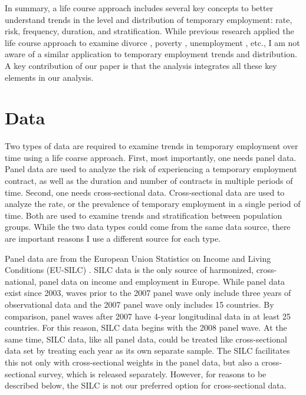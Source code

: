 \documentclass[12pt]{article}
\begin{document}
In summary, a life course approach includes several key concepts to better understand trends in the level and distribution of temporary employment: rate, risk, frequency, duration, and stratification.  While previous research applied the life course approach to examine divorce \citep{kennedy_ruggles_2014}, poverty \citep{sandoval_etal_2009}, unemployment \citep{dietrich_2013}, etc., I am not aware of a similar application to temporary employment trends and distribution.  A key contribution of our paper is that the analysis integrates all these key elements in our analysis.

\section{Data}

Two types of data are required to examine trends in temporary employment over time using a life coarse approach.  First, most importantly, one needs panel data.  Panel data are used to analyze the risk of experiencing a temporary employment contract, as well as the duration and number of contracts in multiple periods of time.  Second, one needs cross-sectional data.  Cross-sectional data are used to analyze the rate, or the prevalence of temporary employment in a single period of time.  Both are used to examine trends and stratification between population groups.  While the two data types could come from the same data source, there are important reasons I use a different source for each type.

Panel data are from the European Union Statistics on Income and Living Conditions (EU-SILC) \citep{eu_silc}.  SILC data is the only source of harmonized, cross-national, panel data on income and employment in Europe.  While panel data exist since 2003, waves prior to the 2007 panel wave only include three years of observational data and the 2007 panel wave only includes 15 countries.  By comparison, panel waves after 2007 have 4-year longitudinal data in at least 25 countries.  For this reason, SILC data begins with the 2008 panel wave.  At the same time, SILC data, like all panel data, could be treated like cross-sectional data set by treating each year as its own separate sample.  The SILC facilitates this not only with cross-sectional weights in the panel data, but also a cross-sectional survey, which is released separately.  However, for reasons to be described below, the SILC is not our preferred option for cross-sectional data. 
\end{document}
